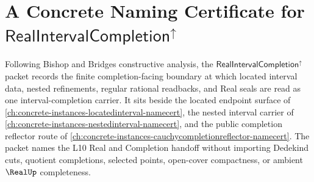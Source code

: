 \providecommand{\RealIntervalCompletionUp}{\mathsf{RealIntervalCompletion}^{\uparrow}}

\chapter{A Concrete Naming Certificate for $\RealIntervalCompletionUp$}
\label{ch:concrete-instances-real-interval-completion-namecert}

Following Bishop and Bridges constructive analysis, the $\RealIntervalCompletionUp$ packet records the finite completion-facing boundary at which located interval data, nested refinements, regular rational readbacks, and Real seals are read as one interval-completion carrier. It sits beside the located endpoint surface of \autoref{ch:concrete-instances-locatedinterval-namecert}, the nested interval carrier of \autoref{ch:concrete-instances-nestedinterval-namecert}, and the public completion reflector route of \autoref{ch:concrete-instances-cauchycompletionreflector-namecert}. The packet names the L10 Real and Completion handoff without importing Dedekind cuts, quotient completions, selected points, open-cover compactness, or ambient $\RealUp$ completeness.

